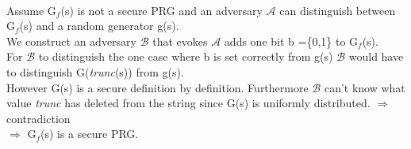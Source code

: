 \begin{itemize}
	\\
	Assume G\(_{f}\)(s) is not a secure PRG and an adversary \(\mathcal{A}\) can distinguish between G\(_{f}\)(s) and a random generator g(s).\\
	We construct an adversary \(\mathcal{B}\) that evokes \(\mathcal{A}\) adds one bit b =\{0,1\} to  G\(_{f}\)(s).\\
	For \(\mathcal{B}\) to distinguish the one case where b is set correctly from g(s) \(\mathcal{B}\) would have to distinguish G(\textit{trunc}(s)) from g(s).\\
	However G(s) is a secure definition by definition. Furthermore \(\mathcal{B}\) can't know what value \textit{trunc} has deleted from the string since 		G(s) is uniformly distributed.
	\(\Rightarrow\)  contradiction\\
	\(\Rightarrow\) G\(_{f}\)(s) is a secure PRG.
\end{itemize}
